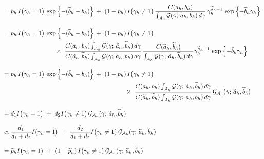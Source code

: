 \documentclass[11pt]{article}
\newcommand{\ind}{I}
\begin{document}
\begin{enumerate}[label=Step \arabic*., leftmargin=13mm, itemsep=10mm]
\begin{align*}
&= p_h\, \ind\big( \gamma_h = 1 \big)\, \exp\left\{ -(\widetilde{b}_h - b_h) \right\} \,+~ (1 - p_h)\, \ind\big( \gamma_h \ne 1 \big)\, \frac{ C(a_h,b_h) }{ \int_{\mathcal{A}_h} \mathcal{G}(\gamma;\, a_h,b_h)\, d\gamma }\, \gamma_h^{ \widetilde{a}_h - 1 }\, \exp\left\{ -\widetilde{b}_h \gamma_h \right\} \\[2ex]
&= p_h\, \ind\big( \gamma_h = 1 \big)\, \exp\left\{ -(\widetilde{b}_h - b_h) \right\} \,+~ (1 - p_h)\, \ind\big( \gamma_h \ne 1 \big) \\
& \hspace{30mm} \times~ \frac{ C(a_h,b_h) \int_{\mathcal{A}_h} \mathcal{G}(\gamma;\, \widetilde{a}_h, \widetilde{b}_h)\, d\gamma }{ C(\widetilde{a}_h, \widetilde{b}_h) \int_{\mathcal{A}_h} \mathcal{G}(\gamma;\, a_h, b_h)\, d\gamma }\, \frac{ C( \widetilde{a}_h, \widetilde{b}_h) }{ \int_{\mathcal{A}_h} \mathcal{G}(\gamma;\, \widetilde{a}_h, \widetilde{b}_h)\, d\gamma } \gamma_h^{ \widetilde{a}_h - 1 }\, \exp\left\{ -\widetilde{b}_h \gamma_h \right\} \\[2ex]
&= p_h\, \ind\big( \gamma_h = 1 \big)\, \exp\left\{ -(\widetilde{b}_h - b_h) \right\} \,+~ (1 - p_h)\, \ind\big( \gamma_h \ne 1 \big)\, \\
& \hspace{70mm} \times~ \frac{ C(a_h,b_h) \int_{\mathcal{A}_h} \mathcal{G}(\gamma;\, \widetilde{a}_h, \widetilde{b}_h)\, d\gamma }{ C(\widetilde{a}_h, \widetilde{b}_h) \int_{\mathcal{A}_h} \mathcal{G}(\gamma;\, a_h, b_h)\, d\gamma }\, \mathcal{G}_{\mathcal{A}_h} (\gamma;\, \widetilde{a}_h, \widetilde{b}_h) \\[2ex]
&= d_1 \ind\big( \gamma_h = 1 \big) ~+~ d_2 \ind\big( \gamma_h \ne 1 \big)\, \mathcal{G}_{\mathcal{A}_h} (\gamma;\, \widetilde{a}_h, \widetilde{b}_h) \\[2ex]
&\propto \frac{ d_1 }{ d_1 + d_2 } \ind\big( \gamma_h = 1 \big) ~+~ \frac{ d_2 }{ d_1 + d_2 } \ind\big( \gamma_h \ne 1 \big)\, \mathcal{G}_{\mathcal{A}_h} (\gamma;\, \widetilde{a}_h, \widetilde{b}_h) \\[2ex]
&= \widetilde{p}_h \ind\big( \gamma_h = 1 \big) ~+~ (1 - \widetilde{p}_h)\, \ind\big( \gamma_h \ne 1 \big)\, \mathcal{G}_{\mathcal{A}_h} (\gamma;\, \widetilde{a}_h, \widetilde{b}_h) \\
\end{align*} \vspace{15mm}





\end{enumerate}
\end{document}

